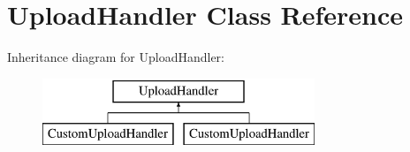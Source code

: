 \hypertarget{class_upload_handler}{\section{Upload\-Handler Class Reference}
\label{class_upload_handler}
}
Inheritance diagram for Upload\-Handler\-:\begin{figure}[H]
\begin{center}
\leavevmode
\includegraphics[height=2.000000cm]{class_upload_handler}
\end{center}
\end{figure}

